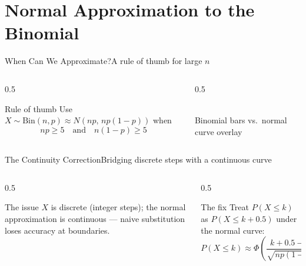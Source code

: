 \documentclass[aspectratio=169,11pt]{beamer}
\begin{document}
\section{Normal Approximation to the Binomial}

\begin{frame}{When Can We Approximate?}{A rule of thumb for large $n$}
  \begin{columns}[T]
    \begin{column}{0.5\textwidth}
      \begin{block}{Rule of thumb}
        \small Use $X\sim\text{Bin}(n,p) \approx N(np,\, np(1-p))$ when
        \[ np \ge 5 \quad \text{and} \quad n(1-p) \ge 5 \]
      \end{block}
    \end{column}
    \begin{column}{0.5\textwidth}
      \centering
      \\
      \scriptsize Binomial bars vs.\ normal curve overlay
    \end{column}
  \end{columns}
\end{frame}

\begin{frame}{The Continuity Correction}{Bridging discrete steps with a continuous curve}
  \begin{columns}[T]
    \begin{column}{0.5\textwidth}
      \begin{alertblock}{The issue}
        \small $X$ is discrete (integer steps); the normal approximation
        is continuous — naive substitution loses accuracy at boundaries.
      \end{alertblock}
    \end{column}
    \begin{column}{0.5\textwidth}
      \begin{exampleblock}{The fix}
        \small Treat $P(X\le k)$ as $P(X \le k+0.5)$ under the normal curve:
        \[ P(X\le k) \approx \Phi\!\left(\frac{k+0.5-np}{\sqrt{np(1-p)}}\right) \]
      \end{exampleblock}
    \end{column}
  \end{columns}
\end{frame}
\end{document}
